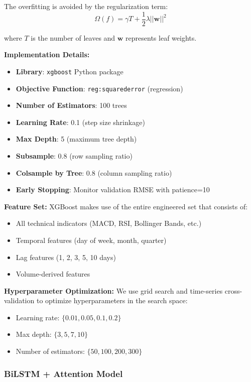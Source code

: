 \documentclass[12pt,a4paper]{article}
\begin{document}
The overfitting is avoided by the regularization term:
\begin{equation}
\Omega(f) = \gamma T + \frac{1}{2}\lambda ||\mathbf{w}||^2
\end{equation}

where $T$ is the number of leaves and $\mathbf{w}$ represents leaf weights.

\textbf{Implementation Details:}
\begin{itemize}
    \item \textbf{Library}: \texttt{xgboost} Python package
    \item \textbf{Objective Function}: \texttt{reg:squarederror} (regression)
    \item \textbf{Number of Estimators}: 100 trees
    \item \textbf{Learning Rate}: 0.1 (step size shrinkage)
    \item \textbf{Max Depth}: 5 (maximum tree depth)
    \item \textbf{Subsample}: 0.8 (row sampling ratio)
    \item \textbf{Colsample by Tree}: 0.8 (column sampling ratio)
    \item \textbf{Early Stopping}: Monitor validation RMSE with patience=10
\end{itemize}

\textbf{Feature Set:}
XGBoost makes use of the entire engineered set that consists of:
\begin{itemize}
    \item All technical indicators (MACD, RSI, Bollinger Bands, etc.)
    \item Temporal features (day of week, month, quarter)
    \item Lag features (1, 2, 3, 5, 10 days)
    \item Volume-derived features
\end{itemize}

\textbf{Hyperparameter Optimization:}
We use grid search and time-series cross-validation to optimize hyperparameters in the search space:
\begin{itemize}
    \item Learning rate: $\{0.01, 0.05, 0.1, 0.2\}$
    \item Max depth: $\{3, 5, 7, 10\}$
    \item Number of estimators: $\{50, 100, 200, 300\}$
\end{itemize}

\subsubsection{BiLSTM + Attention Model}
\end{document}
